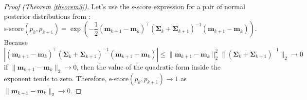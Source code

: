 \documentclass[
11pt,%
tightenlines,%
twoside,%
onecolumn,%
nofloats,%
nobibnotes,%
nofootinbib,%
superscriptaddress,%
noshowpacs,%
centertags]%
{revtex4-2}
\begin{document}
\begin{proof}[Proof (Theorem \ref{theorem3})]
Let's use the s-score expression for a pair of normal posterior distributions from \cite{Aduenko2017}:
\[\text{s-score}(p_k, p_{k+1}) = \exp{\left( -\dfrac{1}{2} (\mathbf{m}_{k+1} - \mathbf{m}_k)^{\top} \left( \mathbf{\Sigma}_k + \mathbf{\Sigma}_{k+1} \right)^{-1} (\mathbf{m}_{k+1} - \mathbf{m}_k) \right)}. \]
Because
    \[ \left| (\mathbf{m}_{k+1} - \mathbf{m}_k)^{\top} \left( \mathbf{\Sigma}_k + \mathbf{\Sigma}_{k+1} \right)^{-1} (\mathbf{m}_{k+1} - \mathbf{m}_k) \right| \leqslant \| \mathbf{m}_{k+1} - \mathbf{m}_k \|_2^2 \| \left( \mathbf{\Sigma}_k + \mathbf{\Sigma}_{k+1} \right)^{-1} \|_2 \to 0 \]
    if $\|\mathbf{m}_{k+1} - \mathbf{m}_k\|_2\to 0$, then the value of the quadratic form inside the exponent tends to zero. Therefore, $\text{s-score}(p_k, p_{k+1}) \to 1$ as $\|\mathbf{m}_{k+1} - \mathbf{m}_k\|_2\to 0$.
\end{proof}
\end{document}
